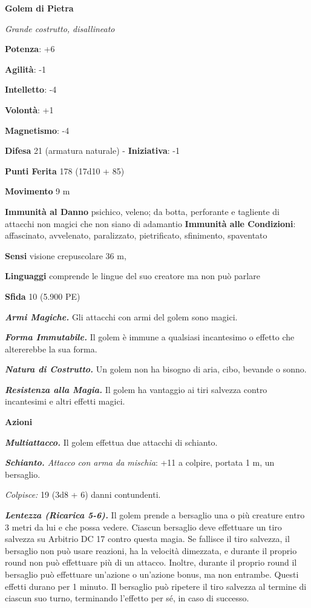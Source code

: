 \begin{multicols}{2}
\textbf{Golem di Pietra}

\emph{Grande costrutto, disallineato}

\textbf{Potenza}: +6

\textbf{Agilità}: -1

\textbf{Intelletto}: -4

\textbf{Volontà}: +1

\textbf{Magnetismo}: -4

\textbf{Difesa} 21 (armatura naturale) - \textbf{Iniziativa}: -1

\textbf{Punti Ferita} 178 (17d10 + 85)

\textbf{Movimento} 9 m

\textbf{Immunità al Danno} psichico, veleno; da botta, perforante e
tagliente di attacchi non magici che non siano di adamantio
\textbf{Immunità alle Condizioni}: affascinato, avvelenato, paralizzato,
pietrificato, sfinimento, spaventato

\textbf{Sensi} visione crepuscolare 36 m, 

\textbf{Linguaggi} comprende le lingue del suo creatore ma non può
parlare

\textbf{Sfida} 10 (5.900 PE)\smallskip

\emph{\textbf{Armi Magiche.}} Gli attacchi con armi del golem sono
magici.

\emph{\textbf{Forma Immutabile.}} Il golem è immune a qualsiasi
incantesimo o effetto che altererebbe la sua forma.

\emph{\textbf{Natura di Costrutto.}} Un golem non ha bisogno di aria,
cibo, bevande o sonno.

\emph{\textbf{Resistenza alla Magia.}} Il golem ha vantaggio ai tiri
salvezza contro incantesimi e altri effetti magici.

\smallskip\textbf{Azioni}

\emph{\textbf{Multiattacco.}} Il golem effettua due attacchi di
schianto.

\emph{\textbf{Schianto.} Attacco con arma da mischia}: +11 a colpire,
portata 1 m, un bersaglio.

\emph{Colpisce:} 19 (3d8 + 6) danni contundenti.

\emph{\textbf{Lentezza (Ricarica 5-6).}} Il golem prende a bersaglio una
o più creature entro 3 metri da lui e che possa vedere. Ciascun
bersaglio deve effettuare un tiro salvezza su Arbitrio DC 17 contro
questa magia. Se fallisce il tiro salvezza, il bersaglio non può usare
reazioni, ha la velocità dimezzata, e durante il proprio round non può
effettuare più di un attacco. Inoltre, durante il proprio round il
bersaglio può effettuare un'azione o un'azione bonus, ma non entrambe.
Questi effetti durano per 1 minuto. Il bersaglio può ripetere il tiro
salvezza al termine di ciascun suo turno, terminando l'effetto per sé,
in caso di successo.


\end{multicols}
